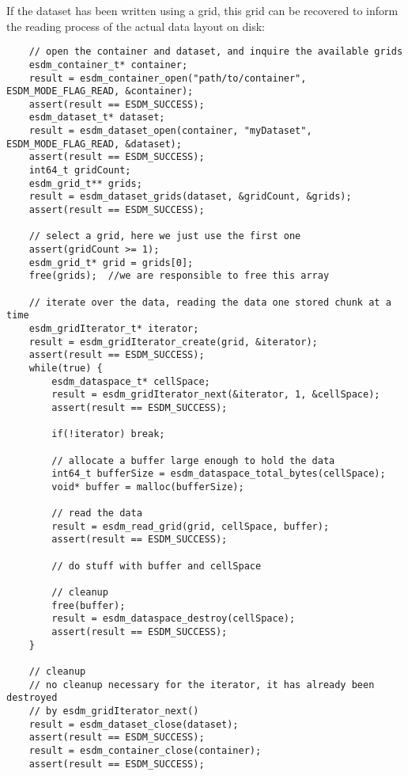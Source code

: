 If the dataset has been written using a grid, this grid can be recovered
to inform the reading process of the actual data layout on disk:

\begin{lstlisting}
    // open the container and dataset, and inquire the available grids
    esdm_container_t* container;
    result = esdm_container_open("path/to/container", ESDM_MODE_FLAG_READ, &container);
    assert(result == ESDM_SUCCESS);
    esdm_dataset_t* dataset;
    result = esdm_dataset_open(container, "myDataset", ESDM_MODE_FLAG_READ, &dataset);
    assert(result == ESDM_SUCCESS);
    int64_t gridCount;
    esdm_grid_t** grids;
    result = esdm_dataset_grids(dataset, &gridCount, &grids);
    assert(result == ESDM_SUCCESS);

    // select a grid, here we just use the first one
    assert(gridCount >= 1);
    esdm_grid_t* grid = grids[0];
    free(grids);  //we are responsible to free this array

    // iterate over the data, reading the data one stored chunk at a time
    esdm_gridIterator_t* iterator;
    result = esdm_gridIterator_create(grid, &iterator);
    assert(result == ESDM_SUCCESS);
    while(true) {
        esdm_dataspace_t* cellSpace;
        result = esdm_gridIterator_next(&iterator, 1, &cellSpace);
        assert(result == ESDM_SUCCESS);

        if(!iterator) break;

        // allocate a buffer large enough to hold the data
        int64_t bufferSize = esdm_dataspace_total_bytes(cellSpace);
        void* buffer = malloc(bufferSize);

        // read the data
        result = esdm_read_grid(grid, cellSpace, buffer);
        assert(result == ESDM_SUCCESS);

        // do stuff with buffer and cellSpace

        // cleanup
        free(buffer);
        result = esdm_dataspace_destroy(cellSpace);
        assert(result == ESDM_SUCCESS);
    }

    // cleanup
    // no cleanup necessary for the iterator, it has already been destroyed 
    // by esdm_gridIterator_next()
    result = esdm_dataset_close(dataset);
    assert(result == ESDM_SUCCESS);
    result = esdm_container_close(container);
    assert(result == ESDM_SUCCESS);
\end{lstlisting}
